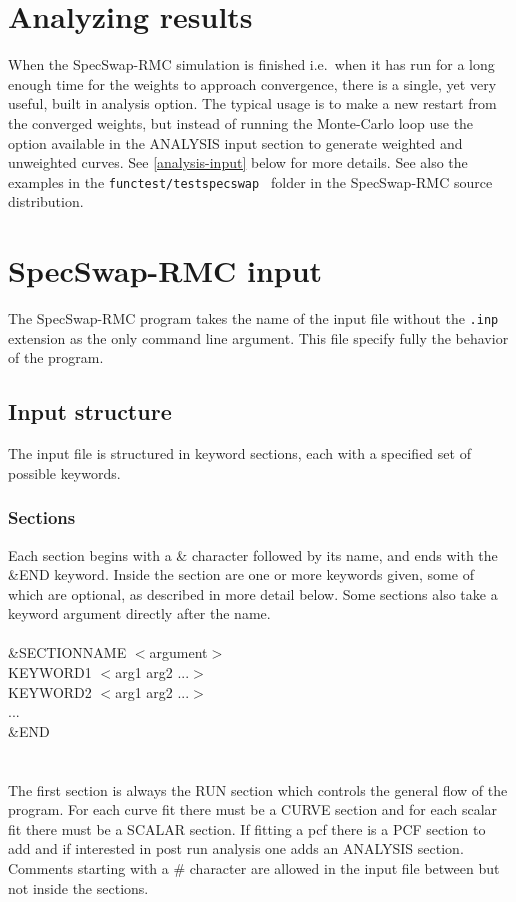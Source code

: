 \documentclass[a4paper, 10pt]{article}
\begin{document}
\section{Analyzing results}
When the SpecSwap-RMC simulation is finished i.e.\ when it has run for a
long enough time for the weights to approach convergence, there is a
single, yet very useful, built in analysis option.
The typical usage is to make a new
restart from the converged weights, but instead of running the
Monte-Carlo loop use the option available in the ANALYSIS input
section to generate weighted and unweighted curves. See
\ref{analysis-input} below for more details.
See also the examples in the {\tt  functest/testspecswap
} folder in the SpecSwap-RMC source distribution.


\section{SpecSwap-RMC input}
\label{input}
The SpecSwap-RMC program takes the name of the input file without the
{\tt .inp} extension as the only command line argument. This file
specify fully the behavior of the program.

\subsection{Input structure}
The input file is structured in keyword sections, each with a specified set of
possible keywords.

\subsubsection{Sections}
Each section begins with a \&
character followed by its name, and ends with the \&END
keyword. Inside the section are one or more keywords given, some of
which are optional, as described in more detail below. Some sections
also take a keyword argument directly after the name.\\\\
\&SECTIONNAME $<$argument$>$\\
KEYWORD1  $<$arg1 arg2 ...$>$\\
KEYWORD2  $<$arg1 arg2 ...$>$\\
...\\
\&END\\
\\\\
The first section is always the RUN section which controls the general
flow of the program. For each curve fit there must be a CURVE
section and for each scalar fit there must be a SCALAR section.
If fitting
a pcf there is a PCF section to add and if interested in post run
analysis one adds an ANALYSIS section.
 Comments starting with a \# character are allowed in the
input file between but not inside the sections.
\end{document}
